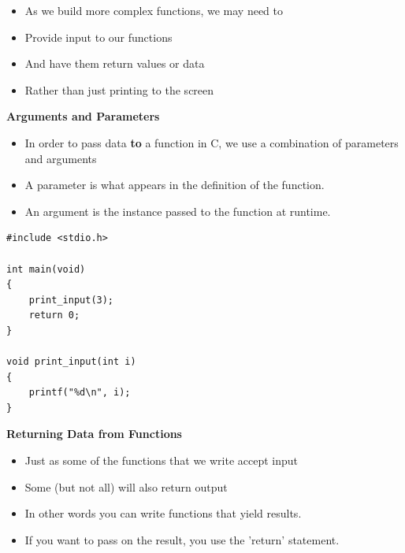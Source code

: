 \documentclass{beamer}
\begin{document}
\begin{frame}
\begin{itemize}
\item As we build more complex functions, we may need to
\end{itemize}
\begin{itemize}
\item Provide input to our functions
\item And have them return values or data
\item Rather than just printing to the screen
\end{itemize}
\end{frame}

\begin{frame}[fragile]
\textbf{Arguments and Parameters}

\begin{itemize}
\item In order to pass data \textbf{to} a function in C, we use a combination of parameters and arguments
\item A parameter is what appears in the definition of the function. 
\item An argument is the instance passed to the function at runtime.
\end{itemize}
\end{frame}

\begin{frame}[fragile]
\begin{block}{}
\begin{lstlisting}
#include <stdio.h>

int main(void) 
{
    print_input(3);
    return 0;
}

void print_input(int i)
{
    printf("%d\n", i);
}
\end{lstlisting}
\end{block}
\end{frame}

\begin{frame}
\textbf{Returning Data from Functions}
\begin{itemize}
\item Just as some of the functions that we write accept input
\item Some (but not all) will also return output
\item In other words you can write functions that yield results. 
\item If you want to pass on the result, you use the 'return'  statement. 
\end{itemize}

\end{frame}
\end{document}
